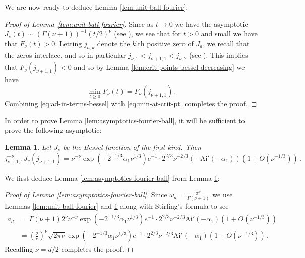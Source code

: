 \documentclass[10pt]{amsart}
\newtheorem{lemma}[theorem]{Lemma}
\theoremstyle{definition}
\theoremstyle{remark}
\newcommand{\Ai}{\mathrm{Ai}}
\begin{document}
	We are now ready to deduce Lemma \ref{lem:unit-ball-fourier}:
	
	\begin{proof}[Proof of Lemma~\ref{lem:unit-ball-fourier}]
		Since as $t \to 0$ we have the asymptotic $J_\nu(t) \sim (\Gamma(\nu+1))^{-1}(t/2)^\nu$ (see \cite[Eq.~10.7.3]{handook2010}), we see that for $t > 0$ and small we have that $F_\nu(t) > 0$.   Letting $j_{a,k}$ denote the $k$'th positive zero of $J_a$, we recall that the zeros interlace, and so in particular $j_{\nu,1} < j_{\nu+1,1} < j_{\nu,2}$ (see \cite[Eq.~10.21.1]{handook2010}).
		This implies that $F_\nu(j_{\nu+1,1}) < 0$ and so by Lemma \ref{lem:crit-points-bessel-decreasing} we have \begin{equation}\label{eq:min-at-crit-pt}
			\min_{t \geq 0} F_\nu(t) = F_\nu(j_{\nu+1,1})\,. 
		\end{equation}
		Combining \eqref{eq:ad-in-terms-bessel} with \eqref{eq:min-at-crit-pt} completes the proof.
	\end{proof}
	
	
	In order to prove Lemma \ref{lem:asymptotics-fourier-ball}, it will be sufficient to prove the following asymptotic:
	
	\begin{lemma}\label{lem:Bessel-minimum}
		Let $J_\nu$ be the Bessel function of the first kind.  Then $$j_{\nu+1,1}^{-\nu}J_\nu(j_{\nu+1,1}) = \nu^{-\nu} \exp\left( -2^{-1/3}\alpha_1 \nu^{1/3}\right)e^{-1} \cdot 2^{2/3} \nu^{-2/3} \left(-\Ai'(-\alpha_1)\right)(1 + O(\nu^{-1/3}))\,.$$
	\end{lemma}
	
	We first deduce Lemma \ref{lem:asymptotics-fourier-ball} from Lemma \ref{lem:Bessel-minimum}:
	\begin{proof}[Proof of Lemma \ref{lem:asymptotics-fourier-ball}]
		Since $\omega_d = \frac{\pi^{\nu}}{\Gamma(\nu+1)}$ we use Lemmas \ref{lem:unit-ball-fourier} and \ref{lem:Bessel-minimum} along with Stirling's formula to see \begin{align*}
			a_d &= \Gamma(\nu+1)2^\nu  \nu^{-\nu} \exp\left( -2^{-1/3}\alpha_1 \nu^{1/3}\right) e^{-1} \cdot 2^{2/3} \nu^{-2/3} \Ai'(-\alpha_1)(1 + O(\nu^{-1/3})) \\
			&=  \left(\frac{2}{e}\right)^\nu \sqrt{2\pi \nu }\exp\left( -2^{-1/3}\alpha_1 \nu^{1/3}\right) e^{-1} \cdot 2^{2/3} \nu^{-2/3} \Ai'(-\alpha_1)(1 + O(\nu^{-1/3}))\,.
		\end{align*}
		Recalling $\nu = d/2$ completes the proof. 
	\end{proof}
	
\end{document}
